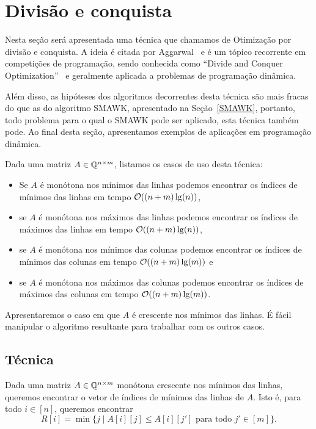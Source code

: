 \chapter{Divisão e conquista}
\label{DivConq}


Nesta seção será apresentada uma técnica que chamamos de Otimização por divisão e conquista. A ideia é citada por Aggarwal~\cite{Aggarwal:1987} e é um tópico recorrente em competições de programação, sendo conhecida como ``Divide and Conquer Optimization''~\cite{Quora:DivConq,CF:Optm} e geralmente aplicada a problemas de programação dinâmica. 

Além disso, as hipóteses dos algoritmos decorrentes desta técnica são mais fracas do que as do algoritmo SMAWK, apresentado na Seção~\ref{SMAWK}, portanto, todo problema para o qual o SMAWK pode ser aplicado, esta técnica também pode. Ao final desta seção, apresentamos exemplos de aplicações em programação dinâmica.  

Dada uma matriz $A \in \mathbb{Q}^{n \times m}$, listamos os casos de uso desta técnica:
\begin{itemize}
    \item Se $A$ é monótona nos mínimos das linhas podemos encontrar os índices de mínimos das linhas em tempo $\mathcal{O}((n+m)\lg(n))$, 
    \item se $A$ é monótona nos máximos das linhas podemos encontrar os índices de máximos das linhas em tempo $\mathcal{O}((n+m)\lg(n))$, 
    \item se $A$ é monótona nos mínimos das colunas podemos encontrar os índices de mínimos das colunas em tempo $\mathcal{O}((n+m)\lg(m))$ e 
    \item se $A$ é monótona nos máximos das colunas podemos encontrar os índices de máximos das colunas em tempo $\mathcal{O}((n+m)\lg(m))$.
\end{itemize}

Apresentaremos o caso em que $A$ é crescente nos mínimos das linhas. É fácil manipular o algoritmo resultante para trabalhar com os outros casos.


\section{Técnica}
Dada uma matriz $A \in \mathbb{Q}^{n \times m}$ monótona crescente nos mínimos das linhas, queremos encontrar o vetor de índices de mínimos das linhas de $A$. Isto é, para todo $i \in [n]$, queremos encontrar
$$ R[i] = \min\{j \mid A[i][j] \leq A[i][j'] \text{ para todo } j' \in [m]\} \text{.}$$  

